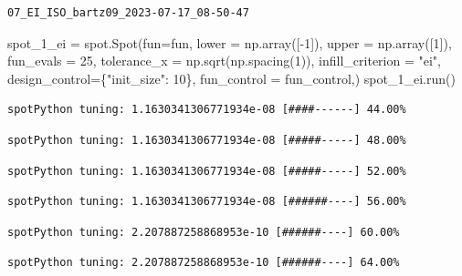 \documentclass[
  letterpaper,
  DIV=11,
  numbers=noendperiod]{scrreprt}
\newenvironment{Shaded}{\begin{snugshade}}{\end{snugshade}}
\newcommand{\DecValTok}[1]{\textcolor[rgb]{0.68,0.00,0.00}{#1}}
\newcommand{\NormalTok}[1]{\textcolor[rgb]{0.00,0.23,0.31}{#1}}
\newcommand{\OperatorTok}[1]{\textcolor[rgb]{0.37,0.37,0.37}{#1}}
\newcommand{\StringTok}[1]{\textcolor[rgb]{0.13,0.47,0.30}{#1}}
\begin{document}
\begin{verbatim}
07_EI_ISO_bartz09_2023-07-17_08-50-47
\end{verbatim}

\begin{Shaded}
\begin{Highlighting}[]
\NormalTok{spot\_1\_ei }\OperatorTok{=}\NormalTok{ spot.Spot(fun}\OperatorTok{=}\NormalTok{fun,}
\NormalTok{                   lower }\OperatorTok{=}\NormalTok{ np.array([}\OperatorTok{{-}}\DecValTok{1}\NormalTok{]),}
\NormalTok{                   upper }\OperatorTok{=}\NormalTok{ np.array([}\DecValTok{1}\NormalTok{]),}
\NormalTok{                   fun\_evals }\OperatorTok{=} \DecValTok{25}\NormalTok{,}
\NormalTok{                   tolerance\_x }\OperatorTok{=}\NormalTok{ np.sqrt(np.spacing(}\DecValTok{1}\NormalTok{)),}
\NormalTok{                   infill\_criterion }\OperatorTok{=} \StringTok{"ei"}\NormalTok{,}
\NormalTok{                   design\_control}\OperatorTok{=}\NormalTok{\{}\StringTok{"init\_size"}\NormalTok{: }\DecValTok{10}\NormalTok{\},}
\NormalTok{                   fun\_control }\OperatorTok{=}\NormalTok{ fun\_control,)}
\NormalTok{spot\_1\_ei.run()}
\end{Highlighting}
\end{Shaded}

\begin{verbatim}
spotPython tuning: 1.1630341306771934e-08 [####------] 44.00% 
\end{verbatim}

\begin{verbatim}
spotPython tuning: 1.1630341306771934e-08 [#####-----] 48.00% 
\end{verbatim}

\begin{verbatim}
spotPython tuning: 1.1630341306771934e-08 [#####-----] 52.00% 
\end{verbatim}

\begin{verbatim}
spotPython tuning: 1.1630341306771934e-08 [######----] 56.00% 
\end{verbatim}

\begin{verbatim}
spotPython tuning: 2.207887258868953e-10 [######----] 60.00% 
\end{verbatim}

\begin{verbatim}
spotPython tuning: 2.207887258868953e-10 [######----] 64.00% 
\end{verbatim}
\end{document}
